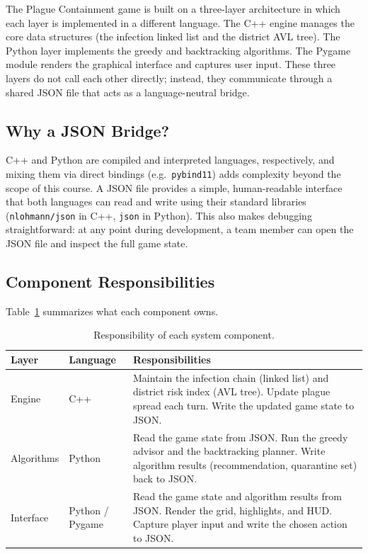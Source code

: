 \documentclass[conference]{IEEEtran}
\begin{document}
The Plague Containment game is built on a three-layer architecture in which
each layer is implemented in a different language. The C++ engine manages the
core data structures (the infection linked list and the district AVL tree). The
Python layer implements the greedy and backtracking algorithms. The Pygame
module renders the graphical interface and captures user input. These three
layers do not call each other directly; instead, they communicate through a
shared JSON file that acts as a language-neutral bridge.

\subsection{Why a JSON Bridge?}

C++ and Python are compiled and interpreted languages, respectively, and mixing
them via direct bindings (e.g.\ \texttt{pybind11}) adds complexity beyond the
scope of this course. A JSON file provides a simple, human-readable interface
that both languages can read and write using their standard libraries
(\texttt{nlohmann/json} in C++, \texttt{json} in Python). This also makes
debugging straightforward: at any point during development, a team member can
open the JSON file and inspect the full game state.

\subsection{Component Responsibilities}

Table~\ref{tab:components} summarizes what each component owns.

\begin{table}[ht]
\centering
\caption{Responsibility of each system component.}
\label{tab:components}
\begin{tabular}{|p{1.4cm}|p{2.0cm}|p{4.0cm}|}
\hline
\textbf{Layer} & \textbf{Language} & \textbf{Responsibilities} \\
\hline
Engine &
C++ &
Maintain the infection chain (linked list) and district risk index (AVL tree).
Update plague spread each turn. Write the updated game state to JSON. \\
\hline
Algorithms &
Python &
Read the game state from JSON. Run the greedy advisor and the backtracking
planner. Write algorithm results (recommendation, quarantine set) back to
JSON. \\
\hline
Interface &
Python / Pygame &
Read the game state and algorithm results from JSON. Render the grid,
highlights, and HUD. Capture player input and write the chosen action to
JSON. \\
\hline
\end{tabular}
\end{table}
\end{document}
